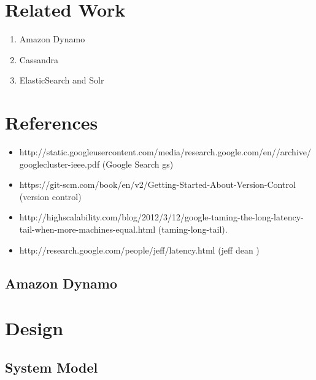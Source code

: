 \documentclass[a4paper, 11pt]{article}
\begin{document}
\section{Related Work}

\begin{enumerate}
	\item Amazon Dynamo
	\item Cassandra
	\item ElasticSearch and Solr
\end{enumerate}



\section{References}

\begin{itemize}

\item http://static.googleusercontent.com/media/research.google.com/en//archive/googlecluster-ieee.pdf (Google Search gs)

\item 
https://git-scm.com/book/en/v2/Getting-Started-About-Version-Control (version control)

\item 
http://highscalability.com/blog/2012/3/12/google-taming-the-long-latency-tail-when-more-machines-equal.html (taming-long-tail).

\item 
http://research.google.com/people/jeff/latency.html (jeff dean )

\end{itemize}

\subsection*{Amazon Dynamo}




\newpage
\section{Design}


\subsection{System Model}
\end{document}
